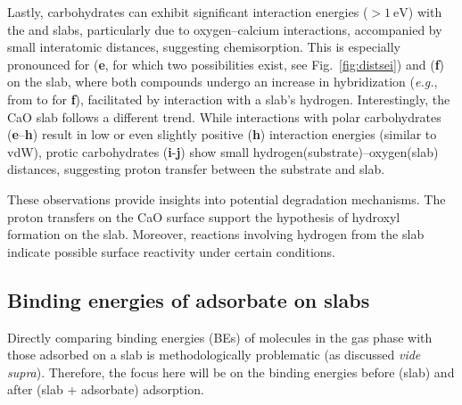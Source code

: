 \documentclass[journal=jpccck,manuscript=article]{achemso}
\begin{document}
Lastly, carbohydrates can exhibit significant interaction energies ($> \SI{1}{\electronvolt}$) with the  and  slabs, particularly due to oxygen--calcium interactions, accompanied by small interatomic distances, suggesting chemisorption. This is especially pronounced for  (\textbf{e}, for which two possibilities exist, see Fig.~\ref{fig:distsei}) and  (\textbf{f}) on the  slab, where both compounds undergo an increase in hybridization (\textit{e.g.}, from  to  for \textbf{f}), facilitated by interaction with a slab's hydrogen.
Interestingly, the CaO slab follows a different trend. While interactions with polar carbohydrates (\textbf{e}–\textbf{h}) result in low or even slightly positive (\textbf{h}) interaction energies (similar to vdW), protic carbohydrates (\textbf{i}-\textbf{j}) show small hydrogen(substrate)--oxygen(slab) distances, suggesting proton transfer between the substrate and slab.

These observations provide insights into potential degradation mechanisms. The proton transfers on the CaO surface support the hypothesis of hydroxyl formation on the slab. Moreover, reactions involving hydrogen from the  slab indicate possible surface reactivity under certain conditions.

\clearpage
\subsection{Binding energies of adsorbate on slabs}\label{sec:BEs}

\newcommand{\XPSsa}[2]{
	\begin{figure}[!h]
		\centering
		\texttt{[image: Figure\#1]}
		\caption{Difference (dotted line) between the XPS spectra before (dashed line) and after (solid line) adsorption for compounds \textbf{#2} on various substrates, as computed using the \cp{E_\infty} protocol. Letters indicate mean binding energies for bulk (``b"), surface (``s", with $\star$ marking the atom closest to the adsorbate), surface hydroxides (``h"), and different atoms of the adsorbate.}
		\label{fig:spectraXPSads#2}
	\end{figure}
}

Directly comparing binding energies (BEs) of molecules in the gas phase with those adsorbed on a slab is methodologically problematic (as discussed \textit{vide supra}). Therefore, the focus here will be on the binding energies before (slab) and after (slab + adsorbate) adsorption.
\end{document}
